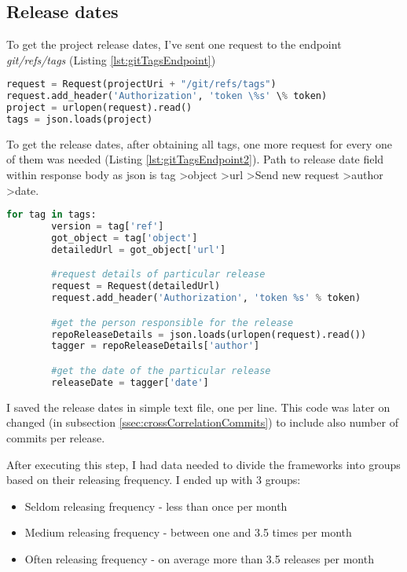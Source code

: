 \subsection{Release dates} \label{ssec:gitReleaseDatesMining}
To get the project release dates, I've sent one request to the endpoint \textit{git/refs/tags} (Listing \ref{lst:gitTagsEndpoint})

\begin{lstlisting}[caption={Requesting all project tags git api tags endpoint},label={lst:gitTagsEndpoint},language=Python]
request = Request(projectUri + "/git/refs/tags")
request.add_header('Authorization', 'token \%s' \% token)
project = urlopen(request).read()
tags = json.loads(project)
\end{lstlisting}

To get the release dates, after obtaining all tags, one more request for every one of them was needed (Listing \ref{lst:gitTagsEndpoint2}). Path to release date field within response body as json is tag \textgreater  object \textgreater  url \textgreater  Send new request \textgreater  author \textgreater  date.

\begin{lstlisting}[caption={Requesting tag details and accessing release date},label={lst:gitTagsEndpoint2},language=Python]
	for tag in tags:
		version = tag['ref']
		got_object = tag['object']
		detailedUrl = got_object['url']

		#request details of particular release
		request = Request(detailedUrl)
		request.add_header('Authorization', 'token %s' % token)

		#get the person responsible for the release
		repoReleaseDetails = json.loads(urlopen(request).read())
		tagger = repoReleaseDetails['author']

		#get the date of the particular release
		releaseDate = tagger['date']
\end{lstlisting}

I saved the release dates in simple text file, one per line. This code was later on changed (in subsection \ref{ssec:crossCorrelationCommits}) to include also number of commits per release.

After executing this step, I had data needed to divide the frameworks into groups based on their releasing frequency. I ended up with 3 groups:
\begin{itemize}
\item{Seldom releasing frequency} - less than once per month
\item{Medium releasing frequency} - between one and 3.5 times per month
\item{Often releasing frequency} - on average more than 3.5 releases per month
\end{itemize}

